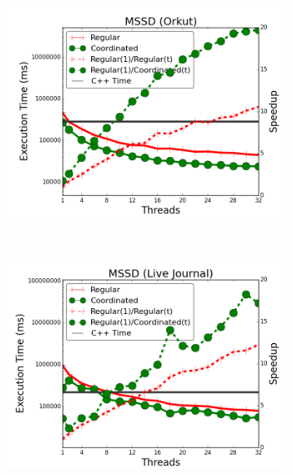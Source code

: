 \begin{figure}[]
\begin{subfigure}[b]{\plotsize\textwidth}
                \label{fig:coordination:coord_unbuffered_sssp_uspowergrid}
        \end{subfigure}\\
        \begin{subfigure}[b]{\plotsize\textwidth}
                \includegraphics[width=\textwidth]{experiments/coordination/unbuffered-shortest-orkut.png}
                \label{fig:coordination:coord_unbuffered_sssp_orkut}
        \end{subfigure}
        ~
        \begin{subfigure}[b]{\plotsize\textwidth}
                \includegraphics[width=\textwidth]{experiments/coordination/unbuffered-shortest-livejournal.png}
                \label{fig:coordination:coord_unbuffered_sssp_livejournal}
        \end{subfigure}\\


\end{figure}
